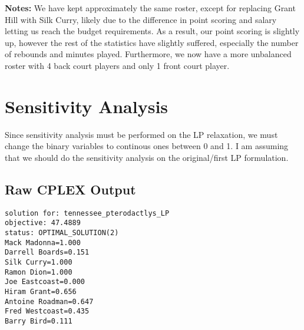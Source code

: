 \documentclass[a4paper,11pt]{article}
\begin{document}
\textbf{Notes:} We have kept approximately the same roster, except for replacing Grant Hill with Silk Curry, likely due to the difference in point scoring and salary letting us reach the budget requirements. As a result, our point scoring is slightly up, however the rest of the statistics have slightly suffered, especially the number of rebounds and minutes played. Furthermore, we now have a more unbalanced roster with 4 back court players and only 1 front court player.

\section{Sensitivity Analysis}
Since sensitivity analysis must be performed on the LP relaxation, we must change the binary variables to continous ones between 0 and 1. I am assuming that we should do the sensitivity analysis on the original/first LP formulation.

\subsection{Raw CPLEX Output}
\begin{verbatim}
solution for: tennessee_pterodactlys_LP
objective: 47.4889
status: OPTIMAL_SOLUTION(2)
Mack Madonna=1.000
Darrell Boards=0.151
Silk Curry=1.000
Ramon Dion=1.000
Joe Eastcoast=0.000
Hiram Grant=0.656
Antoine Roadman=0.647
Fred Westcoast=0.435
Barry Bird=0.111
\end{verbatim}

\newpage
\end{document}
